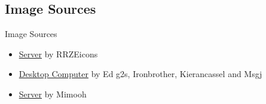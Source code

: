 \subsection{Image Sources}
\begin{frame}{Image Sources}
    \begin{itemize}
	\item \href{https://commons.wikimedia.org/wiki/File:Server-multiple.svg}{Server} by RRZEicons
    \item \href{https://commons.wikimedia.org/wiki/File:Computer-aj_aj_ashton_01.svg}{Desktop Computer} by Ed g2s,
          Ironbrother, Kierancassel and Msgj
    \item \href{https://commons.wikimedia.org/wiki/File:Server_by_mimooh.svg}{Server} by Mimooh
    \end{itemize}
\end{frame}
